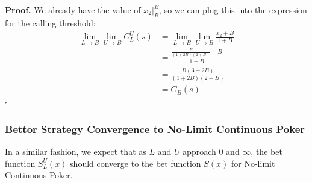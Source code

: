 \documentclass[a4paper,12pt]{article}
\theoremstyle{plain}
\theoremstyle{definition}
\newenvironment{customproof}[1][Proof]{\noindent\textbf{#1.} }{\hfill$\square$\vspace{1em}}
\begin{document}
\begin{customproof}
We already have the value of $x_2|_B^B$, so we can plug this into the expression for the calling threshold:
\begin{align*}
    \lim_{L \to B} \lim_{U \to B} C_L^U(s) & = \lim_{L \to B} \lim_{U \to B} \frac{x_2+B}{1+B} \\
    & = \frac{\frac{B}{(1+2B)(2+B)} + B}{1+B} \\
    & = \frac{B(3+2B)}{(1+2B)(2+B)} \\
    & = C_B(s)
\end{align*}
\end{customproof}

\subsubsection{Bettor Strategy Convergence to No-Limit Continuous Poker}

In a similar fashion, we expect that as $L$ and $U$ approach $0$ and $\infty$, the bet function $S_L^U(x)$ should converge to the bet function $S(x)$ for No-limit Continuous Poker.
\end{document}
